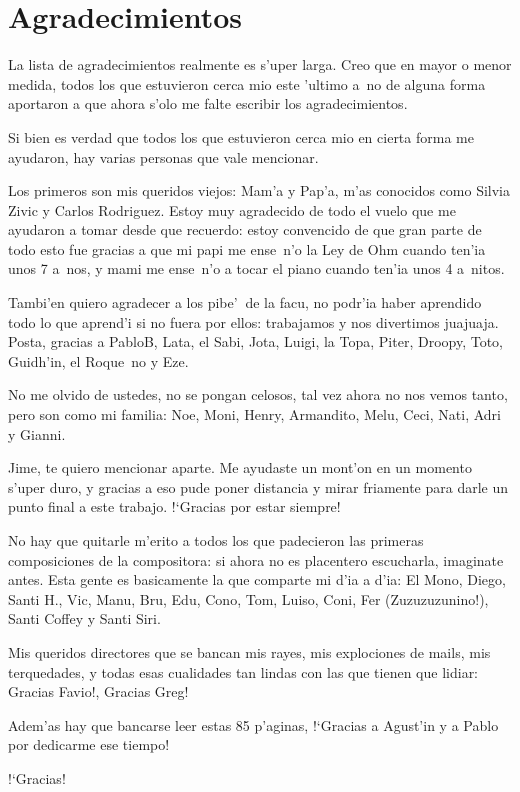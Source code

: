 \section*{Agradecimientos}
La lista de agradecimientos realmente es s'uper larga. Creo que en mayor o menor medida, todos los que estuvieron cerca mio este 'ultimo a~no de alguna forma
aportaron a que ahora s'olo me falte escribir los agradecimientos. \newline

Si bien es verdad que todos los que estuvieron cerca mio en cierta forma me ayudaron, hay varias personas que vale mencionar. \newline

Los primeros son mis queridos viejos: Mam'a y Pap'a, m'as conocidos como Silvia Zivic y Carlos Rodriguez. Estoy muy agradecido de todo el vuelo que me ayudaron a tomar
desde que recuerdo: estoy convencido de que gran parte de todo esto fue gracias a que mi papi me ense~n'o la Ley de Ohm cuando ten'ia unos 7 a~nos, 
y mami me ense~n'o a tocar el piano cuando ten'ia unos 4 a~nitos.\newline

Tambi'en quiero agradecer a los pibe'$\ $ de la facu, no podr'ia haber aprendido todo lo que aprend'i si no fuera por ellos: trabajamos y nos divertimos juajuaja. 
Posta, gracias a PabloB, Lata, el Sabi, Jota, Luigi, la Topa, Piter, Droopy, Toto, Guidh'in, el Roque~no y Eze.\newline

No me olvido de ustedes, no se pongan celosos, tal vez ahora no nos vemos tanto, pero son como mi familia: Noe, Moni, Henry, Armandito, Melu, Ceci, Nati, Adri y 
Gianni. \newline

Jime, te quiero mencionar aparte. Me ayudaste un mont'on en un momento s'uper duro, y gracias a eso pude poner distancia y mirar friamente para darle
un punto final a este trabajo. !`Gracias por estar siempre! \newline

No hay que quitarle m'erito a todos los que padecieron las primeras composiciones de la compositora: si ahora no es placentero escucharla, imaginate antes. 
Esta gente es basicamente la que comparte mi d'ia a d'ia: El Mono, Diego, Santi H., Vic, Manu, Bru, Edu, Cono, Tom, Luiso, Coni, Fer (Zuzuzuzunino!), 
Santi Coffey y Santi Siri.\newline

Mis queridos directores que se bancan mis rayes, mis explociones de mails, mis terquedades, y todas esas cualidades tan lindas con las que tienen que lidiar: 
Gracias Favio!, Gracias Greg!\newline

Adem'as hay que bancarse leer estas 85 p'aginas, !`Gracias a Agust'in y a Pablo por dedicarme ese tiempo!\newline

\begin{center}
\LARGE{!`Gracias!}
\end{center}
